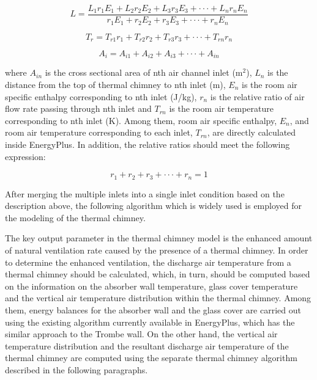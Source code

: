 \begin{equation}
L = \frac{{{L_1}{r_1}{E_1} + {L_2}{r_2}{E_2} + {L_3}{r_3}{E_3} +  \cdot  \cdot  \cdot  + {L_n}{r_n}{E_n}}}{{{r_1}{E_1} + {r_2}{E_2} + {r_3}{E_3} +  \cdot  \cdot  \cdot  + {r_n}{E_n}}}
\end{equation}

\begin{equation}
{T_r} = {T_{r1}}{r_1} + {T_{r2}}{r_2} + {T_{r3}}{r_3} +  \cdot  \cdot  \cdot  + {T_{rn}}{r_n}
\end{equation}

\begin{equation}
{A_i} = {A_{i1}} + {A_{i2}} + {A_{i3}} +  \cdot  \cdot  \cdot  + {A_{in}}
\end{equation}

where \(A_{in}\) is the cross sectional area of nth air channel inlet (m\(^{2}\)), \(L_{n}\) is the distance from the top of thermal chimney to nth inlet (m), \(E_{n}\) is the room air specific enthalpy corresponding to nth inlet (J/kg), \(r_{n}\) is the relative ratio of air flow rate passing through nth inlet and \(T_{rn}\) is the room air temperature corresponding to nth inlet (K). Among them, room air specific enthalpy, \(E_{n}\), and room air temperature corresponding to each inlet, \(T_{rn}\), are directly calculated inside EnergyPlus. In addition, the relative ratios should meet the following expression:

\begin{equation}
{r_1} + {r_2} + {r_3} +  \cdot  \cdot  \cdot  + {r_n} = 1
\end{equation}

After merging the multiple inlets into a single inlet condition based on the description above, the following algorithm which is widely used is employed for the modeling of the thermal chimney.

The key output parameter in the thermal chimney model is the enhanced amount of natural ventilation rate caused by the presence of a thermal chimney. In order to determine the enhanced ventilation, the discharge air temperature from a thermal chimney should be calculated, which, in turn, should be computed based on the information on the absorber wall temperature, glass cover temperature and the vertical air temperature distribution within the thermal chimney. Among them, energy balances for the absorber wall and the glass cover are carried out using the existing algorithm currently available in EnergyPlus, which has the similar approach to the Trombe wall. On the other hand, the vertical air temperature distribution and the resultant discharge air temperature of the thermal chimney are computed using the separate thermal chimney algorithm described in the following paragraphs.

